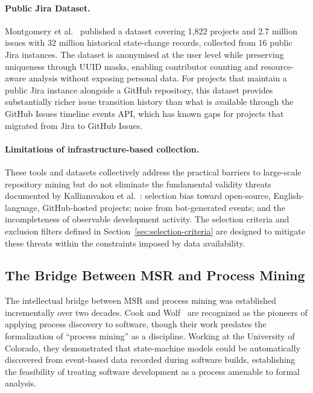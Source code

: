 \paragraph{Public Jira Dataset.}
Montgomery et al.~\cite{montgomery2022jira} published a dataset covering
1,822 projects and 2.7 million issues with 32 million historical
state-change records, collected from 16 public Jira instances. The dataset
is anonymised at the user level while preserving uniqueness through UUID
masks, enabling contributor counting and resource-aware analysis without
exposing personal data. For projects that maintain a public Jira instance
alongside a GitHub repository, this dataset provides substantially richer
issue transition history than what is available through the GitHub Issues
timeline events API, which has known gaps for projects that migrated from
Jira to GitHub Issues.

\paragraph{Limitations of infrastructure-based collection.}
These tools and datasets collectively address the practical barriers to
large-scale repository mining but do not eliminate the fundamental
validity threats documented by Kalliamvakou et
al.~\cite{kochhar2019moving}: selection bias toward open-source,
English-language, GitHub-hosted projects; noise from bot-generated events;
and the incompleteness of observable development activity. The selection
criteria and exclusion filters defined in
Section~\ref{sec:selection-criteria} are designed to mitigate these
threats within the constraints imposed by data availability.


\subsection{The Bridge Between MSR and Process Mining}
\label{sec:msr-pm-bridge}

The intellectual bridge between MSR and process mining was established
incrementally over two decades. Cook and Wolf~\cite{cook1998} are recognized as the pioneers of applying process discovery to software, though their work predates the formalization of ``process mining'' as a discipline. Working at the University of Colorado, they demonstrated that state-machine models could be automatically discovered from event-based data recorded during software builds, establishing the feasibility of treating software development as a process amenable to formal analysis.

